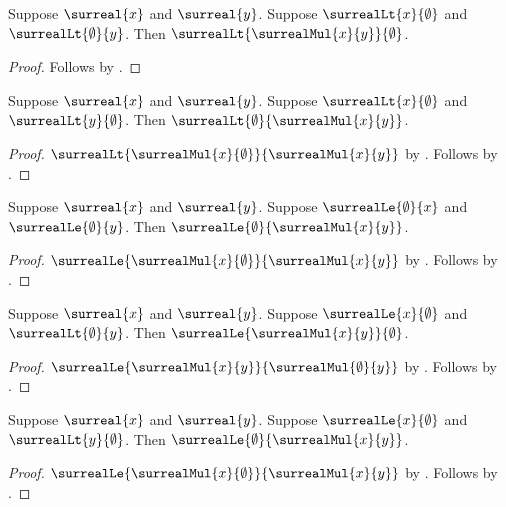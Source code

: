 \begin{corollary}\label{surreal_mul_neg_pos}
    Suppose $\surreal{x}$ and $\surreal{y}$.
    Suppose $\surrealLt{x}{\emptyset}$ and
        $\surrealLt{\emptyset}{y}$.
    Then $\surrealLt{\surrealMul{x}{y}}{\emptyset}$.
\end{corollary}
\begin{proof}
    Follows by
        .
\end{proof}

\begin{corollary}\label{surreal_mul_neg_neg}
    Suppose $\surreal{x}$ and $\surreal{y}$.
    Suppose $\surrealLt{x}{\emptyset}$ and
        $\surrealLt{y}{\emptyset}$.
    Then $\surrealLt{\emptyset}{\surrealMul{x}{y}}$.
\end{corollary}
\begin{proof}
    $\surrealLt{\surrealMul{x}{\emptyset}}{\surrealMul{x}{y}}$
        by .
    Follows by .
\end{proof}

\begin{corollary}\label{surreal_mul_nonneg_nonneg}
    Suppose $\surreal{x}$ and $\surreal{y}$.
    Suppose $\surrealLe{\emptyset}{x}$ and
        $\surrealLe{\emptyset}{y}$.
    Then $\surrealLe{\emptyset}{\surrealMul{x}{y}}$.
\end{corollary}
\begin{proof}
    $\surrealLe{\surrealMul{x}{\emptyset}}{\surrealMul{x}{y}}$
        by .
    Follows by .
\end{proof}

\begin{corollary}\label{surreal_mul_nonpos_pos}
    Suppose $\surreal{x}$ and $\surreal{y}$.
    Suppose $\surrealLe{x}{\emptyset}$ and
        $\surrealLt{\emptyset}{y}$.
    Then $\surrealLe{\surrealMul{x}{y}}{\emptyset}$.
\end{corollary}
\begin{proof}
    $\surrealLe{\surrealMul{x}{y}}{\surrealMul{\emptyset}{y}}$
        by
        .
    Follows by .
\end{proof}

\begin{corollary}\label{surreal_mul_nonpos_neg}
    Suppose $\surreal{x}$ and $\surreal{y}$.
    Suppose $\surrealLe{x}{\emptyset}$ and
        $\surrealLt{y}{\emptyset}$.
    Then $\surrealLe{\emptyset}{\surrealMul{x}{y}}$.
\end{corollary}
\begin{proof}
    $\surrealLe{\surrealMul{x}{\emptyset}}{\surrealMul{x}{y}}$
        by
        .
    Follows by .
\end{proof}

